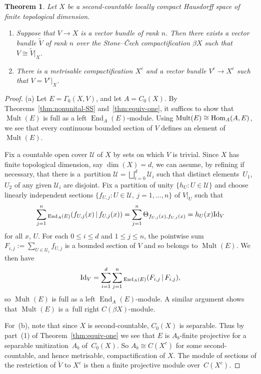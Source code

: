 \documentclass[10pt,a4paper]{amsart}
\numberwithin{equation}{section}
\newtheorem{thm}{Theorem}[section]
\DeclareMathOperator{\End}{End} %
\DeclareMathOperator{\Mult}{Mult} %
\begin{document}
\begin{thm}
\label{cor:VB}
Let $X$ be a second-countable locally compact Hausdorff space of finite topological dimension.
\begin{enumerate}\itemsep=0pt
\item[$a)$]\label{it:bundle extension} Suppose that $V\to X$ is a vector bundle of rank $n$. Then there exists a vector bundle $\tilde{V}$ of rank $n$ over the Stone--\v{C}ech compactification $\beta X$ such that $V \cong \tilde{V}|_X$.
\item[$b)$] There is a metrisable compactification $X^c$ and a vector bundle $V^c\to X^c$ such that $V=V^c|_X$.
\end{enumerate}
\end{thm}
\begin{proof}
(a) Let $E=\Gamma_0(X,V)$, and let $A = C_0(X)$. By Theorems~\ref{thm:nonunital-SS} and~\ref{thm:equiv-one}, it suf\/f\/ices to show that $\Mult(E)$ is full as a left $\End_A(E)$-module. Using $\Mult(E)\cong {\rm Hom}_A(A,E)$, we see that every continuous bounded section of $V$ def\/ines an element of $\Mult(E)$.

Fix a countable open cover $\mathcal{U}$ of $X$ by sets on which $V$ is trivial. Since $X$ has f\/inite topological dimension, say $\dim(X) = d$, we can assume, by ref\/ining if necessary, that there is a~partition $\mathcal{U} = \bigsqcup\limits^d_{i=0} \mathcal{U}_i$ such that distinct elements~$U_1$,~$U_2$ of any given $\mathcal{U}_i$ are disjoint. Fix a partition of unity $\{h_U \colon U\in \mathcal{U}\}$ and choose linearly independent sections $\{f_{U,j} \colon U \in \mathcal{U},\ j=1,\dots,n\}$ of $V|_U$ such that
\begin{gather*}
\sum_{j=1}^n{}_{\End_A(E)}(f_{U,j}(x) \,|\, f_{U,j}(x)) =\sum_{j=1}^n\Theta_{f_{U,j}(x) , f_{U,j}(x)} = h_U(x){\rm Id}_V
\end{gather*}
for all $x$, $U$. For each $0 \le i \le d$ and $1\leq j\leq n$, the pointwise sum $F_{i,j} := \sum\limits_{U \in \mathcal{U}_i}
f_{U,j}$ is a bounded section of $V$ and so belongs to $\Mult(E)$. We then have
\begin{gather*}
{\rm Id}_V = \sum^d_{i=1}\sum_{j=1}^n {}_{\End_A(E)}(F_{i,j} \,|\, F_{i,j}),
\end{gather*}
so $\Mult(E)$ is full as a left $\End_A(E)$-module. A similar argument shows that $\Mult(E)$ is a~full right $C(\beta X)$-module.

For~(b), note that since $X$ is second-countable, $C_0(X)$ is separable. Thus by part~(1) of Theorem~\ref{thm:equiv-one} we see that $E$ is $A_b$-f\/inite projective for a separable unitization~$A_b$ of~$C_0(X)$. So $A_b \cong C(X^c)$ for some second-countable, and hence metrisable, compactif\/ication of $X$. The module of sections of the restriction of $\tilde{V}$ to $X^c$ is then a f\/inite projective module over~$C(X^c)$.
\end{proof}
\end{document}
